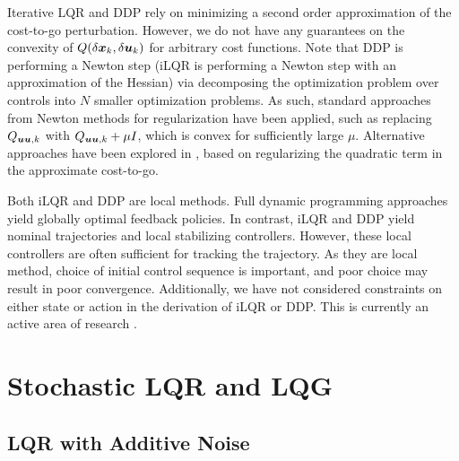 Iterative LQR and DDP rely on minimizing a second order approximation of the cost-to-go perturbation. However, we do not have any guarantees on the convexity of $Q(\delta \bm{x}_k, \delta \bm{u}_k)$ for arbitrary cost functions. Note that DDP is performing a Newton step \cite{liao1992advantages} (iLQR is performing a Newton step with an approximation of the Hessian) via decomposing the optimization problem over controls into $N$ smaller optimization problems. As such, standard approaches from Newton methods for regularization have been applied, such as replacing $Q_{\bm{u}\bm{u},k}$ with $Q_{\bm{u}\bm{u},k} + \mu I$, which is convex for sufficiently large $\mu$. Alternative approaches have been explored in \cite{tassa2012synthesis,tassa2014control}, based on regularizing the quadratic term in the approximate cost-to-go. 

Both iLQR and DDP are local methods. Full dynamic programming approaches yield globally optimal feedback policies. In contrast, iLQR and DDP yield nominal trajectories and local stabilizing controllers. However, these local controllers are often sufficient for tracking the trajectory. As they are local method, choice of initial control sequence is important, and poor choice may result in poor convergence. Additionally, we have not considered constraints on either state or action in the derivation of iLQR or DDP. This is currently an active area of research \cite{xie2017differential, tassa2014control, giftthaler2017projection}.


\section{Stochastic LQR and LQG}

\subsection{LQR with Additive Noise}

